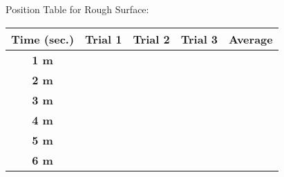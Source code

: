 \documentclass[12pt, letterpaper]{report}
\begin{document}
      Position Table for Rough Surface:
      \begin{center}
        \begin{tabular}{| c | c | c | c | c |}
          \hline
          \textbf{Time (sec.)} & \textbf{Trial 1} & \textbf{Trial 2} & \textbf{Trial 3} & \textbf{Average} \\
          \hline
          \textbf{1 m} & & & & \\
          \hline
          \textbf{2 m} & & & & \\
          \hline
          \textbf{3 m} & & & & \\
          \hline
          \textbf{4 m} & & & & \\
          \hline
          \textbf{5 m} & & & & \\
          \hline
          \textbf{6 m} & & & & \\
          \hline
        \end{tabular}
      \end{center}
    \pagebreak
\end{document}

